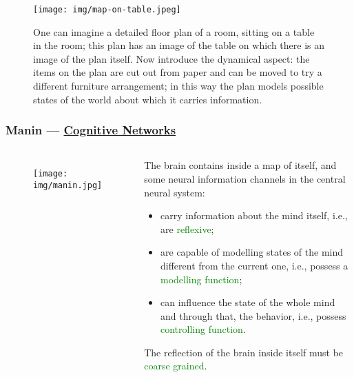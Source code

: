 \documentclass[UTF8,aspectratio=43,11pt,colorlinks,compress,openany]{beamer}%
\begin{document}
\begin{frame}\frametitle{}
\begin{figure}
\texttt{[image: img/map-on-table.jpeg]}\caption{One can imagine a detailed floor plan of a room, sitting on a table in the room; this plan has an image of the table on which there is an image of the plan itself. Now introduce the dynamical aspect: the items on the plan are cut out from paper and can be moved to try a different furniture arrangement; in this way the plan models possible states of the world about which it carries information.}
\end{figure}
\end{frame}

\begin{frame}\frametitle{Manin --- \href{https://arxiv.org/abs/1709.03114}{Cognitive Networks}}
\begin{columns}
\begin{figure}[H]
\texttt{[image: img/manin.jpg]}
\end{figure}
\begin{block}{}
The brain contains inside a map of itself, and some neural information channels in the central neural system:
\begin{itemize}
	\item carry information about the mind itself, i.e., are \textcolor{green}{reflexive};
	\item are capable of modelling states of the mind different from the current one, i.e., possess a \textcolor{green}{modelling function};
	\item can influence the state of the whole mind and through that, the behavior, i.e., possess \textcolor{green}{controlling function}.
\end{itemize}
The reflection of the brain inside itself must be \textcolor{green}{coarse grained}.
\end{block}
\end{columns}
\end{frame}
\end{document}

